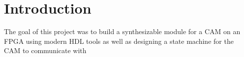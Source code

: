 \section{Introduction}
The goal of this project was to build a synthesizable module for a CAM on an FPGA using modern HDL tools as well as designing a state machine for the CAM to communicate with